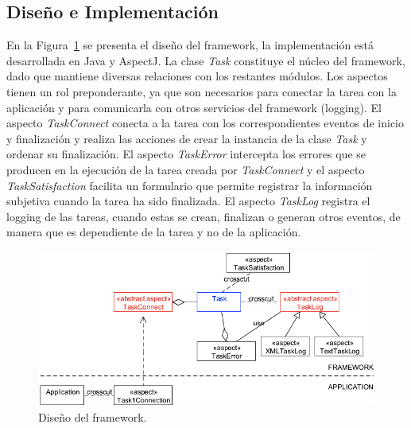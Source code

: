 \subsection{Diseño e Implementación}
\label{subsec:disenio_e_implementacion}

En la Figura~\ref{fig:fig3} se presenta el diseño del framework, la implementación está desarrollada en Java y AspectJ. La clase \textit{Task} constituye el núcleo del framework, dado que mantiene diversas relaciones con los restantes módulos. Los aspectos tienen un rol preponderante, ya que son necesarios para conectar la tarea con la aplicación y para comunicarla con otros servicios del framework (logging). El aspecto \textit{TaskConnect} conecta a la tarea con los correspondientes eventos de inicio y finalización y realiza las acciones de crear la instancia de la clase \textit{Task} y ordenar su finalización. El aspecto \textit{TaskError} intercepta los errores que se producen en la ejecución de la tarea creada por \textit{TaskConnect} y el aspecto \textit{TaskSatisfaction} facilita un formulario que permite registrar la información subjetiva cuando la tarea ha sido finalizada. El aspecto \textit{TaskLog} registra el logging de las tareas, cuando estas se crean, finalizan o generan otros eventos, de manera que es dependiente de la tarea y no de la aplicación. 
\squeezeup
\begin{figure}[ht!]
	\centering
	\includegraphics[scale=0.47]{figs/fig3.png}
	\caption{\label{fig:fig3}  Diseño del framework.}
\end{figure}
\squeezeup

